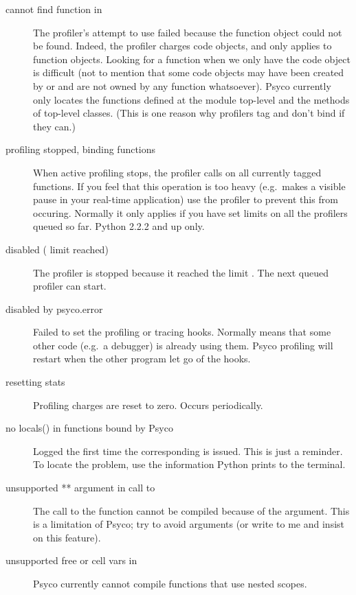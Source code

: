 \documentclass{manual}
\begin{document}
\begin{description}
\item[cannot find function  in ]
  The profiler's attempt to use  failed because the function object could not be found.  Indeed, the profiler charges code objects, and  only applies to function objects.  Looking for a function when we only have the code object is difficult (not to mention that some code objects may have been created by  or  and are not owned by any function whatsoever).  Psyco currently only locates the functions defined at the module top-level and the methods of top-level classes.  (This is one reason why profilers tag and don't bind if they can.)

\item[profiling stopped, binding  functions]
  When active profiling stops, the profiler calls  on all currently tagged functions.  If you feel that this operation is too heavy (e.g.\ makes a visible pause in your real-time application) use the  profiler to prevent this from occuring.  Normally it only applies if you have set limits on all the profilers queued so far.  Python 2.2.2 and up only.

\item[disabled ( limit reached)]
  The profiler is stopped because it reached the limit .  The next queued profiler can start.

\item[disabled by psyco.error]
  Failed to set the profiling or tracing hooks.  Normally means that some other code (e.g.\ a debugger) is already using them.  Psyco profiling will restart when the other program let go of the hooks.

\item[resetting stats]
  Profiling charges are reset to zero.  Occurs periodically.

\item[no locals() in functions bound by Psyco]
  Logged the first time the corresponding  is issued.  This is just a reminder.  To locate the problem, use the information Python prints to the terminal.
  
\item[unsupported ** argument in call to ]
  The call to the function  cannot be compiled because of the \code{**} argument.  This is a limitation of Psyco; try to avoid \code{**} arguments (or write to me and insist on this feature).
  
\item[unsupported free or cell vars in ]
  Psyco currently cannot compile functions that use nested scopes.

\end{description}
\end{document}
